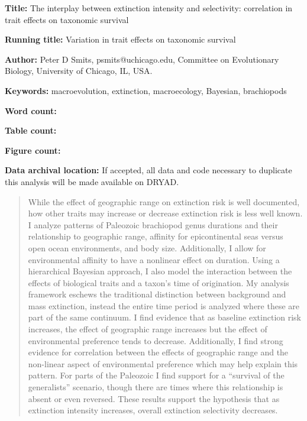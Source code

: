 \documentclass{article}
\begin{document}
\linenumbers
\modulolinenumbers[2]


\begin{titlepage}
  \begin{large}
    \textbf{Title:} The interplay between extinction intensity and selectivity: correlation in trait effects on taxonomic survival
  \end{large}

  \textbf{Running title:} Variation in trait effects on taxonomic survival

  \textbf{Author:} Peter D Smits, psmits@uchicago.edu, Committee on Evolutionary Biology, University of Chicago, IL, USA.

  \textbf{Keywords:} macroevolution, extinction, macroecology, Bayesian, brachiopods

  \textbf{Word count:} 
  
  \textbf{Table count:}
 
  \textbf{Figure count:}

  \textbf{Data archival location:} If accepted, all data and code necessary to duplicate this analysis will be made available on DRYAD.

\end{titlepage}

\begin{abstract}
  While the effect of geographic range on extinction risk is well documented, how other traits may increase or decrease extinction risk is less well known. I analyze patterns of Paleozoic brachiopod genus durations and their relationship to geographic range, affinity for epicontinental seas versus open ocean environments, and body size. Additionally, I allow for environmental affinity to have a nonlinear effect on duration. Using a hierarchical Bayesian approach, I also model the interaction between the effects of biological traits and a taxon's time of origination. My analysis framework eschews the traditional distinction between background and mass extinction, instead the entire time period is analyzed where these are part of the same continuum. I find evidence that as baseline extinction risk increases, the effect of geographic range increases but the effect of environmental preference tends to decrease. Additionally, I find strong evidence for correlation between the effects of geographic range and the non-linear aspect of environmental preference which may help explain this pattern. For parts of the Paleozoic I find support for a ``survival of the generalists'' scenario, though there are times where this relationship is absent or even reversed. These results support the hypothesis that as extinction intensity increases, overall extinction selectivity decreases.
\end{abstract}
\end{document}
